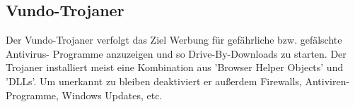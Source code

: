 \subsection{Vundo-Trojaner}
Der Vundo-Trojaner verfolgt das Ziel Werbung für gefährliche bzw. gefälschte Antivirus-
Programme anzuzeigen und so Drive-By-Downloads zu starten. Der Trojaner installiert
meist eine Kombination aus 'Browser Helper Objects' und 'DLLs'. Um unerkannt zu bleiben
deaktiviert er außerdem Firewalls, Antiviren-Programme, Windows Updates, etc. 
\cite{BEKTRO}